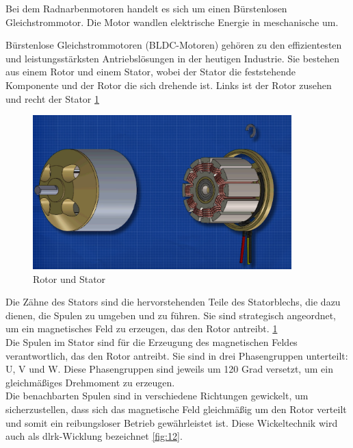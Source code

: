 Bei dem Radnarbenmotoren handelt es sich um einen Bürstenlosen Gleichstrommotor. Die Motor wandlen elektrische Energie in meschanische um.

Bürstenlose Gleichstrommotoren (BLDC-Motoren) gehören zu den effizientesten und leistungsstärksten Antriebslösungen in der heutigen Industrie. Sie bestehen aus einem Rotor und einem Stator, wobei der Stator die feststehende Komponente und der Rotor die sich drehende ist. Links ist der Rotor zusehen und recht der Stator \ref{fig:11}

\begin{figure}[h]
    \centering
    \includegraphics[width=10cm]{images/RotorStator.png}
    \caption{Rotor und Stator\cite{ingenieursmentalitat_burstenloser_2022}}%
    \label{fig:11}
\end{figure}

Die Zähne des Stators sind die hervorstehenden Teile des Statorblechs, die dazu dienen, die Spulen zu umgeben und zu führen. Sie sind strategisch angeordnet, um ein magnetisches Feld zu erzeugen, das den Rotor antreibt.  \ref{fig:11}\\

Die Spulen im Stator sind für die Erzeugung des magnetischen Feldes verantwortlich, das den Rotor antreibt. Sie sind in drei Phasengruppen unterteilt: U, V und W. Diese Phasengruppen sind jeweils um 120 Grad versetzt, um ein gleichmäßiges Drehmoment zu erzeugen.\\

Die benachbarten Spulen sind in verschiedene Richtungen gewickelt, um sicherzustellen, dass sich das magnetische Feld gleichmäßig um den Rotor verteilt und somit ein reibungsloser Betrieb gewährleistet ist. Diese Wickeltechnik wird auch als dlrk-Wicklung bezeichnet \ref{fig:12}.\\

